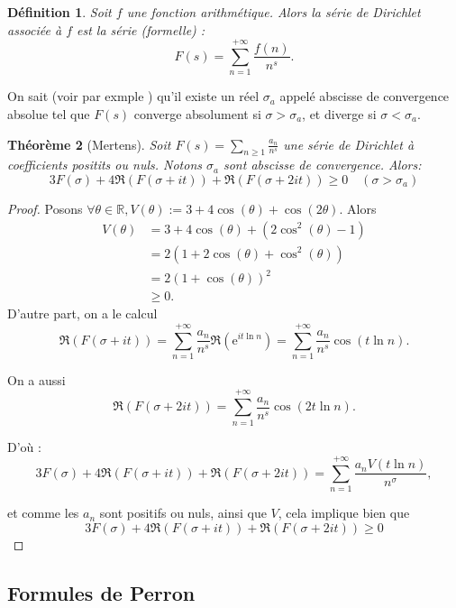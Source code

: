 \documentclass[french]{report}
\newtheorem{theorem}{Théorème}[section]
\newtheorem{definition}[theorem]{Définition}
\begin{document}
\begin{definition}\label{def:serie-dirichlet}
  Soit $f$ une fonction arithmétique. Alors la série de Dirichlet associée à $f$ est la série (formelle) :
  \[ F(s) = \sum_{n=1}^{+\infty}\frac{f(n)}{n^s}. \]
\end{definition}

On sait (voir par exmple \cite{hindry}) qu'il existe un réel $\sigma_a$ appelé abscisse de convergence absolue tel que $F(s)$ converge absolument si $\sigma>\sigma_a$, et diverge si $\sigma<\sigma_a$.

\begin{theorem}[Mertens]\label{thm:mertens-positif}
  Soit $F(s) =\sum_{n\geq1}\frac{a_n}{n^s}$ une série de Dirichlet à coefficients positits ou nuls. Notons $\sigma_a$ sont abscisse de convergence. Alors:
  \[ 3F(\sigma)+4\Re(F(\sigma+it))+\Re(F(\sigma+2it))\geq0 \quad(\sigma>\sigma_a) \]
\end{theorem}

\begin{proof}
  Posons $\forall\theta\in\mathbb{R}, V(\theta) := 3+4\cos(\theta)+\cos(2\theta)$. Alors
  \begin{align*}
    V(\theta) &= 3+4\cos(\theta)+(2\cos^2(\theta)-1) \\
              &= 2(1+2\cos(\theta)+\cos^2(\theta)) \\
              &= 2(1+\cos(\theta))^2 \\
              &\geq0.
  \end{align*}
  D'autre part, on a le calcul
  \[
    \Re(F(\sigma+it))
    =\sum_{n=1}^{+\infty}\frac{a_n}{n^s}\Re(\mathrm{e}^{it\ln n})
    =\sum_{n=1}^{+\infty}\frac{a_n}{n^s}\cos(t\ln n).
  \]

  On a aussi
  \[
    \Re(F(\sigma+2it))
    = \sum_{n=1}^{+\infty}\frac{a_n}{n^s}\cos(2t\ln n).
  \]

  D'où :
  \[
    3F(\sigma)+4\Re(F(\sigma+it))+\Re(F(\sigma+2it))
    = \sum_{n=1}^{+\infty}\frac{a_n V(t\ln n)}{n^\sigma},
  \]

  et comme les $a_n$ sont positifs ou nuls, ainsi que $V$, cela implique bien que
  \[ 3F(\sigma)+4\Re(F(\sigma+it))+\Re(F(\sigma+2it))\geq0 \]
  
\end{proof}

\subsection{Formules de Perron}
\end{document}
